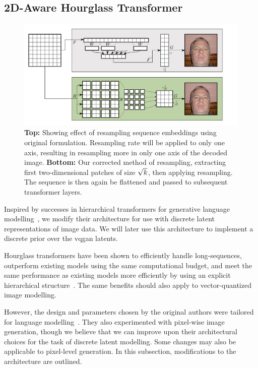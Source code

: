 \subsection{2D-Aware Hourglass Transformer}
\label{subsec:improvedHourglass}

\begin{figure}[htp]
    \label{fig:resample}
    \centering
    \includegraphics[width=\textwidth]{figures/resample.pdf}
    \caption{
        \textbf{Top:} Showing effect of resampling sequence embeddings using
        original formulation. Resampling rate will be applied to only one axis,
        resulting in resampling more in only one axis of the decoded image.
        \textbf{Bottom:} Our corrected method of resampling, extracting first
        two-dimensional patches of size $\sqrt{k}$, then applying
        resampling. The sequence is then again be flattened and passed to
        subsequent transformer layers.
    }
\end{figure}


Inspired by successes in hierarchical transformers for generative language
modelling~\cite{nawrot2021hierarchical}, we modify their architecture for use
with discrete latent representations of image data. We will later use this
architecture to implement a discrete prior over the \gls{vqgan} latents. 

Hourglass transformers have been shown to efficiently handle long-sequences,
outperform existing models using the same computational budget, and meet the
same performance as existing models more efficiently by using an explicit
hierarchical structure~\cite{nawrot2021hierarchical}. The same benefits should
also apply to vector-quantized image modelling. 

However, the design and parameters chosen by the original authors were tailored
for language modelling~\cite{nawrot2021hierarchical}. They also experimented
with pixel-wise image generation, though we believe that we can improve upon
their architectural choices for the task of discrete latent modelling. Some
changes may also be applicable to pixel-level generation. In this subsection,
modifications to the architecture are outlined.

